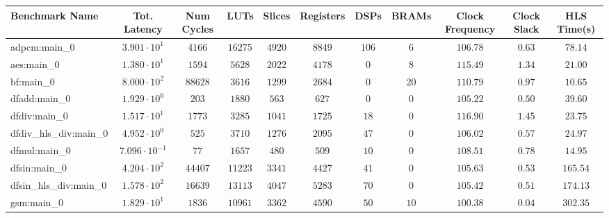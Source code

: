 \begin{tabular}{|l|c|c|c|c|c|c|c|c|c|c|}
\hline
Benchmark Name          & Tot. Latency            & Num Cycles & LUTs       & Slices    & Registers & DSPs    & BRAMs   & Clock Frequency & Clock Slack & HLS Time(s) \\
\hline
adpcm:main\_0           & $ 3.901 \cdot 10^{1}  $ & $ 4166   $ & $ 16275  $ & $ 4920  $ & $ 8849  $ & $ 106 $ & $ 6   $ & $ 106.78      $ & $ 0.63    $ & $ 78.14   $ \\
aes:main\_0             & $ 1.380 \cdot 10^{1}  $ & $ 1594   $ & $ 5628   $ & $ 2022  $ & $ 4178  $ & $ 0   $ & $ 8   $ & $ 115.49      $ & $ 1.34    $ & $ 21.00   $ \\
bf:main\_0              & $ 8.000 \cdot 10^{2}  $ & $ 88628  $ & $ 3616   $ & $ 1299  $ & $ 2684  $ & $ 0   $ & $ 20  $ & $ 110.79      $ & $ 0.97    $ & $ 10.65   $ \\
dfadd:main\_0           & $ 1.929 \cdot 10^{0}  $ & $ 203    $ & $ 1880   $ & $ 563   $ & $ 627   $ & $ 0   $ & $ 0   $ & $ 105.22      $ & $ 0.50    $ & $ 39.60   $ \\
dfdiv:main\_0           & $ 1.517 \cdot 10^{1}  $ & $ 1773   $ & $ 3285   $ & $ 1041  $ & $ 1725  $ & $ 18  $ & $ 0   $ & $ 116.90      $ & $ 1.45    $ & $ 23.75   $ \\
dfdiv\_hls\_div:main\_0 & $ 4.952 \cdot 10^{0}  $ & $ 525    $ & $ 3710   $ & $ 1276  $ & $ 2095  $ & $ 47  $ & $ 0   $ & $ 106.02      $ & $ 0.57    $ & $ 24.97   $ \\
dfmul:main\_0           & $ 7.096 \cdot 10^{-1} $ & $ 77     $ & $ 1657   $ & $ 480   $ & $ 509   $ & $ 10  $ & $ 0   $ & $ 108.51      $ & $ 0.78    $ & $ 14.95   $ \\
dfsin:main\_0           & $ 4.204 \cdot 10^{2}  $ & $ 44407  $ & $ 11223  $ & $ 3341  $ & $ 4427  $ & $ 41  $ & $ 0   $ & $ 105.63      $ & $ 0.53    $ & $ 165.54  $ \\
dfsin\_hls\_div:main\_0 & $ 1.578 \cdot 10^{2}  $ & $ 16639  $ & $ 13113  $ & $ 4047  $ & $ 5283  $ & $ 70  $ & $ 0   $ & $ 105.42      $ & $ 0.51    $ & $ 174.13  $ \\
gsm:main\_0             & $ 1.829 \cdot 10^{1}  $ & $ 1836   $ & $ 10961  $ & $ 3362  $ & $ 4590  $ & $ 50  $ & $ 10  $ & $ 100.38      $ & $ 0.04    $ & $ 302.35  $ \\

\end{tabular}
